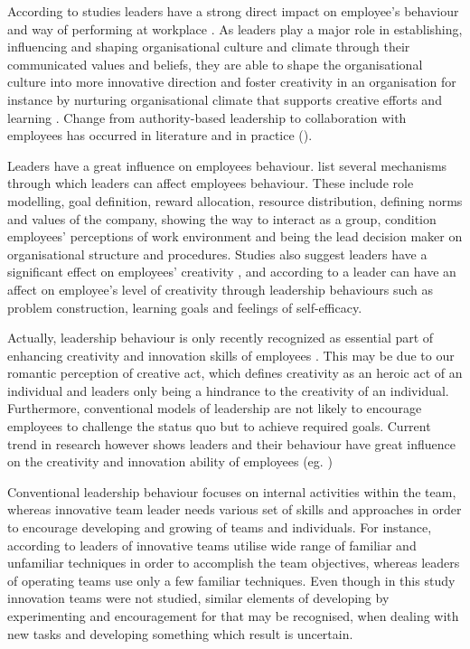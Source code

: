 According to studies leaders have a strong direct impact on employee's behaviour and way of performing at workplace \citep{katz1978social,redmond1993putting}. As leaders play a major role in establishing, influencing and shaping organisational culture and climate through their communicated values and beliefs, they are able to shape the organisational culture into more innovative direction and foster creativity in an organisation \citep{jung2003role,schein2010organizational} for instance by nurturing organisational climate that supports creative efforts and learning \citep{yukl2002leadership}. Change from authority-based leadership to collaboration with employees has occurred in literature and in practice (\citep{amabile2008creativity,farson2002failuretolerantleader}). 

Leaders have a great influence on employees behaviour. \citet{avolio1988transformational} list several mechanisms through which leaders can affect employees behaviour. These include role modelling, goal definition, reward allocation, resource distribution, defining norms and values of the company, showing the way to interact as a group, condition employees' perceptions of work environment and being the lead decision maker on organisational structure and procedures. Studies also suggest leaders have a significant effect on employees' creativity \citep{hennessey19881}, and according to \citet{redmond1993putting} a leader can have an affect on employee's level of creativity through leadership behaviours such as problem construction, learning goals and feelings of self-efficacy. 

Actually, leadership behaviour is only recently recognized as essential part of enhancing creativity and innovation skills of employees \citep{mumford2002leading}. This may be due to our romantic perception of creative act, which defines creativity as an heroic act of an individual and leaders only being a hindrance to the creativity of an individual. Furthermore, conventional models of leadership are not likely to encourage employees to challenge the status quo but to achieve required goals.\citep{mumford2002leading} Current trend in research however shows leaders and their behaviour have great influence on the creativity and innovation ability of employees (eg. \citep{mumford2002leading,jung2001transformational,amabile1998kill})

Conventional leadership behaviour focuses on internal activities within the team, whereas innovative team leader needs various set of skills and approaches in order to encourage developing and growing of teams and individuals. For instance, according to \citet{barczak1989leadership} leaders of innovative teams utilise wide range of familiar and unfamiliar techniques in order to accomplish the team objectives, whereas leaders of operating teams use only a few familiar techniques. Even though in this study innovation teams were not studied, similar elements of developing by experimenting and encouragement for that may be recognised, when dealing with new tasks and developing something which result is uncertain. 

